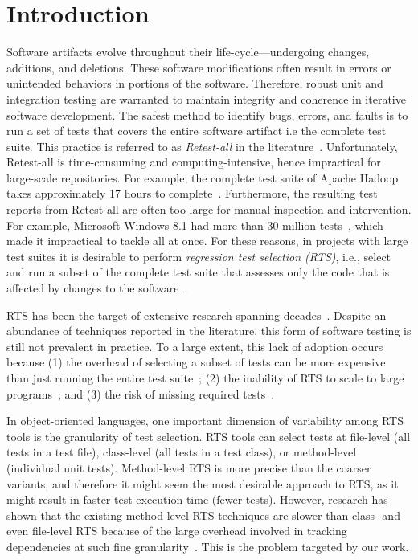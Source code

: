 \chapter{Introduction}

Software artifacts evolve throughout their life-cycle---undergoing changes, additions, and deletions. These software modifications often result in errors or unintended behaviors in portions of the software. Therefore, robust unit and integration testing are warranted to maintain integrity and coherence in iterative software development. The safest method to identify bugs, errors, and faults is to run a set of tests that covers the entire software artifact i.e the complete test suite. This practice is referred to as \textit{Retest-all} in the literature~\cite{leung1989insights, wong1997study, onoma1998regression}. Unfortunately, Retest-all is time-consuming and computing-intensive, hence impractical for large-scale repositories. For example, the complete test suite of Apache Hadoop takes approximately 17 hours to complete~\cite{ekstazi}. Furthermore, the resulting test reports from Retest-all are often too large for manual inspection and intervention. For example, Microsoft Windows 8.1 had more than 30 million tests~\cite{herzig2015art}, which made it impractical to tackle all at once. For these reasons, in projects with large test suites it is desirable to perform \emph{regression test selection (RTS)}, i.e., select and run a subset of the complete test suite that assesses only the code that is affected by changes to the software~\cite{memon2017taming, elbaum2014techniques, rothermel2000regression}. 

RTS has been the target of extensive research spanning decades~\cite{rothermel,  leung1989insights, wong1997study, onoma1998regression, rothermel2001prioritizing, yoo2012regression, kimhistory}. Despite an abundance of techniques reported in the literature, this form of software testing is still not prevalent in practice. To a large extent, this lack of adoption occurs because (1) the overhead of selecting a subset of tests can be more expensive than just running the entire test suite~\cite{faulttracer}; (2) the inability of RTS to scale to large programs~\cite{onoma1998regression}; and (3) the risk of missing required tests~\cite{rothermelsaferts}.  

In object-oriented languages, one important dimension of variability among RTS tools is the granularity of test selection. RTS tools can select tests at file-level (all tests in a test file), class-level (all tests in a test class), or method-level (individual unit tests). Method-level RTS is more precise than the coarser variants, and therefore it might seem the most desirable approach to RTS, as it might result in faster test execution time (fewer tests). However, research has shown that the existing method-level RTS techniques are slower than class- and even file-level RTS because of the large overhead involved in tracking dependencies at such fine granularity~\cite{legunsen2016extensive, faulttracer}. This is the problem targeted by our work.

